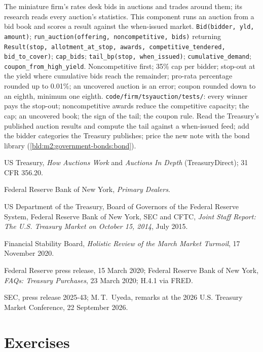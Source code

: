 \begin{build}
 The miniature firm's rates desk bids in auctions and trades
around them; its research reads every auction's statistics. This component
runs an auction from a bid book and scores a result against the when-issued
market.
 \texttt{Bid(bidder, yld, amount)};
\texttt{run\_auction(offering, noncompetitive, bids)} returning
\texttt{Result(stop, allotment\_at\_stop, awards, competitive\_tendered,
bid\_to\_cover)}; \texttt{cap\_bids}; \texttt{tail\_bp(stop, when\_issued)};
\texttt{cumulative\_demand}; \texttt{coupon\_from\_high\_yield}.
 Noncompetitive first; 35\% cap per bidder; stop-out at the
yield where cumulative bids reach the remainder; pro-rata percentage rounded
up to 0.01\%; an uncovered auction is an error; coupon rounded down to an
eighth, minimum one eighth.
 \texttt{code/firm/tsyauction/tests/}: every winner
pays the stop-out; noncompetitive awards reduce the competitive capacity; the
cap; an uncovered book; the sign of the tail; the coupon rule.
 Read the Treasury's published auction results and compute
the tail against a when-issued feed; add the bidder categories the Treasury
publishes; price the new note with the bond library
(\cref{bld:m2:government-bonds:bond}).
\end{build}

\begin{omsources}
\item US Treasury, \emph{How Auctions Work} and \emph{Auctions In Depth}
(TreasuryDirect); 31 CFR 356.20.
\item Federal Reserve Bank of New York, \emph{Primary Dealers}.
\item US Department of the Treasury, Board of Governors of the Federal
Reserve System, Federal Reserve Bank of New York, SEC and CFTC, \emph{Joint
Staff Report: The U.S. Treasury Market on October 15, 2014}, July 2015.
\item Financial Stability Board, \emph{Holistic Review of the March Market
Turmoil}, 17 November 2020.
\item Federal Reserve press release, 15 March 2020; Federal Reserve Bank of
New York, \emph{FAQs: Treasury Purchases}, 23 March 2020; H.4.1 via FRED.
\item SEC, press release 2025-43; M.\,T.\ Uyeda, remarks at the 2026 U.S.
Treasury Market Conference, 22 September 2026.
\end{omsources}

\section{Exercises}

